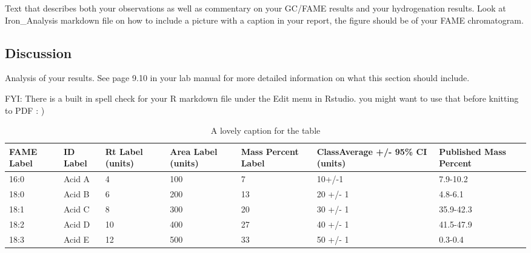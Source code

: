 \documentclass[]{article}
\begin{document}
Text that describes both your observations as well as commentary on your
GC/FAME results and your hydrogenation results. Look at Iron\_Analysis
markdown file on how to include a picture with a caption in your report,
the figure should be of your FAME chromatogram.

\subsection{Discussion}\label{discussion}

Analysis of your results. See page 9.10 in your lab manual for more
detailed information on what this section should include.

FYI: There is a built in spell check for your R markdown file under the
Edit menu in Rstudio. you might want to use that before knitting to PDF
: )

\begin{table}[ht]
\centering
\parbox{2.7in}{\caption{A lovely caption for the table}} 
\begin{tabular}{|p{0.7in}|p{0.7in}|p{0.7in}|p{0.7in}|p{0.7in}|p{0.9in}|p{0.7in}|}
  \hline
\textbf{FAME Label} & \textbf{ID Label} & \textbf{Rt Label (units)} & \textbf{Area Label (units)} & \textbf{Mass Percent Label} & \textbf{ClassAverage +/- 95\% CI (units)} & \textbf{Published Mass Percent} \\ 
  \hline
16:0 & Acid A &       4 &     100 &       7 & 10+/-1 & 7.9-10.2 \\ 
   \hline
18:0 & Acid B &       6 &     200 &      13 & 20 +/- 1 & 4.8-6.1 \\ 
   \hline
18:1 & Acid C &       8 &     300 &      20 & 30 +/- 1 & 35.9-42.3 \\ 
   \hline
18:2 & Acid D &      10 &     400 &      27 & 40 +/- 1 & 41.5-47.9 \\ 
   \hline
18:3 & Acid E &      12 &     500 &      33 & 50 +/- 1 & 0.3-0.4 \\ 
   \hline
\end{tabular}
\end{table}
\end{document}
